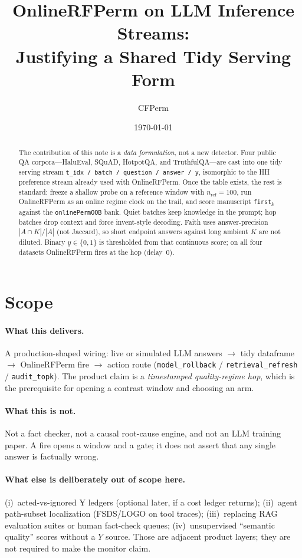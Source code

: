 \documentclass[11pt]{article}
\title{OnlineRFPerm on LLM Inference Streams:\\
Justifying a Shared Tidy Serving Form}
\author{CFPerm}
\date{\today}
\begin{document}
\maketitle

\begin{abstract}
The contribution of this note is a \emph{data formulation}, not a new
detector. Four public QA corpora---HaluEval, SQuAD, HotpotQA, and
TruthfulQA---are cast into one tidy serving stream
\texttt{t\_idx / batch / question / answer / y}, isomorphic to the HH
preference stream already used with OnlineRFPerm.
Once the table exists, the rest is standard: freeze a shallow probe on a
reference window with $n_{\mathrm{ref}}=100$, run OnlineRFPerm as an online
regime clock on the trail, and score manuscript \texttt{first}$_k$ against the
\texttt{onlinePermOOB} bank.
Quiet batches keep knowledge in the prompt; hop batches drop context and force
invent-style decoding.
Faith uses answer-precision $|A\cap K|/|A|$ (not Jaccard), so short endpoint
answers against long ambient $K$ are not diluted.
Binary $y\in\{0,1\}$ is thresholded from that continuous score; on all four
datasets OnlineRFPerm fires at the hop (delay~$0$).
\end{abstract}

\section{Scope}
\paragraph{What this delivers.}
A production-shaped wiring:
live or simulated LLM answers $\to$ tidy dataframe $\to$ OnlineRFPerm fire
$\to$ action route (\texttt{model\_rollback} / \texttt{retrieval\_refresh} /
\texttt{audit\_topk}).
The product claim is a \emph{timestamped quality-regime hop}, which is the
prerequisite for opening a contrast window and choosing an arm.

\paragraph{What this is not.}
Not a fact checker, not a causal root-cause engine, and not an LLM training
paper. A fire opens a window and a gate; it does not assert that any single
answer is factually wrong.

\paragraph{What else is deliberately out of scope here.}
(i)~acted-vs-ignored ¥ ledgers (optional later, if a cost ledger returns);
(ii)~agent path-subset localization (FSDS/LOGO on tool traces);
(iii)~replacing RAG evaluation suites or human fact-check queues;
(iv)~unsupervised ``semantic quality'' scores without a $Y$ source.
Those are adjacent product layers; they are not required to make the monitor
claim.
\end{document}
